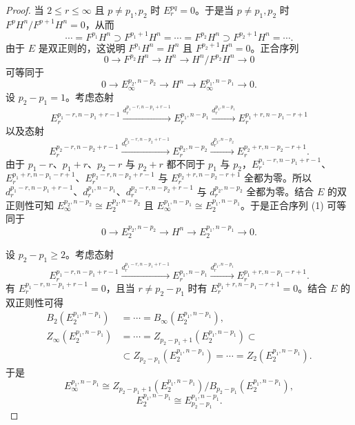 \begin{proof}
当 $2\le r\le\infty$ 且 $p\ne p_1,p_2$ 时 $E_r^{pq}=0$。于是当 $p\ne p_1,p_2$ 时 $F^pH^n/F^{p+1}H^n=0$，从而
\[
\cdots=F^{p_1}H^n\supset F^{p_1+1}H^n=\cdots=F^{p_2}H^n\supset F^{p_2+1}H^n=\cdots.
\]
由于 $E$ 是双正则的，这说明 $F^{p_1}H^n=H^n$ 且 $F^{p_2+1}H^n=0$。正合序列
\[
0\to F^{p_2}H^n\to H^n\to H^n/F^{p_2}H^n\to 0
\]
可等同于
\begin{equation*}\tag{1}
0\to E_\infty^{p_2,n-p_2}\to H^n\to E_\infty^{p_1,n-p_1}\to 0.
\end{equation*}
设 $p_2-p_1=1$。考虑态射
\[
E_r^{p_1-r,n-p_1+r-1}\xrightarrow{d_r^{p_1-r,n-p_1+r-1}}E_r^{p_1,n-p_1}\xrightarrow{d_r^{p_1,n-p_1}}E_r^{p_1+r,n-p_1-r+1}
\]
以及态射
\[
E_r^{p_2-r,n-p_2+r-1}\xrightarrow{d_r^{p_2-r,n-p_2+r-1}}E_r^{p_2,n-p_2}\xrightarrow{d_r^{p_2,n-p_2}}E_r^{p_2+r,n-p_2-r+1}.
\]
由于 $p_1-r$、$p_1+r$、$p_2-r$ 与 $p_2+r$ 都不同于 $p_1$ 与 $p_2$，$E_r^{p_1-r,n-p_1+r-1}$、$E_r^{p_1+r,n-p_1-r+1}$、$E_r^{p_2-r,n-p_2+r-1}$ 与 $E_r^{p_2+r,n-p_2-r+1}$ 全都为零。所以 $d_r^{p_1-r,n-p_1+r-1}$、$d_r^{p_1,n-p_1}$、$d_r^{p_2-r,n-p_2+r-1}$ 与 $d_r^{p_2,n-p_2}$ 全都为零。结合 $E$ 的双正则性可知 $E_\infty^{p_2,n-p_2}\cong E_2^{p_2,n-p_2}$ 且 $E_\infty^{p_1,n-p_1}\cong E_2^{p_1,n-p_1}$。于是正合序列 (1) 可等同于
\[
0\to E_2^{p_2,n-p_2}\to H^n\to E_2^{p_1,n-p_1}\to 0.
\]

设 $p_2-p_1\ge 2$。考虑态射
\[
E_r^{p_1-r,n-p_1+r-1}\xrightarrow{d_r^{p_1-r,n-p_1+r-1}}E_r^{p_1,n-p_1}\xrightarrow{d_r^{p_1,n-p_1}}E_r^{p_1+r,n-p_1-r+1}.
\]
有 $E_r^{p_1-r,n-p_1+r-1}=0$，且当 $r\ne p_2-p_1$ 时有 $E_r^{p_1+r,n-p_1-r+1}=0$。结合 $E$ 的双正则性可得
\[
\begin{aligned}
B_2(E_2^{p_1,n-p_1})&=\cdots=B_\infty(E_2^{p_1,n-p_1}),\\
Z_\infty(E_2^{p_1,n-p_1})&=\cdots=Z_{p_2-p_1+1}(E_2^{p_1,n-p_1})\subset\\
&\subset Z_{p_2-p_1}(E_2^{p_1,n-p_1})=\cdots=Z_2(E_2^{p_1,n-p_1}).
\end{aligned}
\]
于是
\begin{equation*}\tag{2}
E_\infty^{p_1,n-p_1}\cong Z_{p_2-p_1+1}(E_2^{p_1,n-p_1})/B_{p_2-p_1}(E_2^{p_1,n-p_1}),
\end{equation*}
\begin{equation*}\tag{3}
E_2^{p_1,n-p_1}\cong E_{p_2-p_1}^{p_1,n-p_1}.
\end{equation*}


\end{proof}
